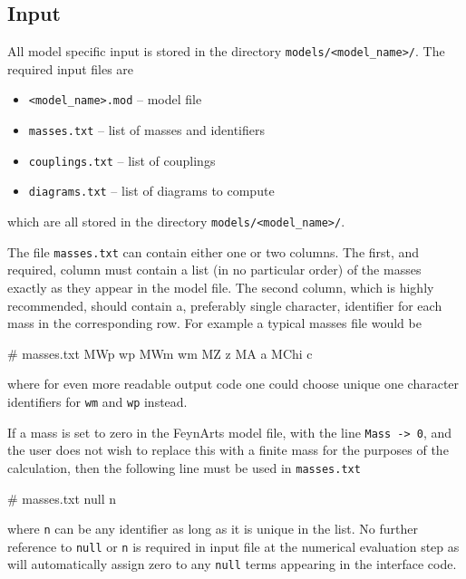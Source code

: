\subsection{Input}

All model specific input is stored in the directory \lstinline{models/<model_name>/}.  The required input files are
\begin{itemize}
\item \lstinline{<model_name>.mod}  -- \feynarts model file
\item \lstinline{masses.txt} -- list of masses and identifiers
\item \lstinline{couplings.txt} -- list of couplings
\item \lstinline{diagrams.txt} -- list of diagrams to compute
\end{itemize}
which are all stored in the directory \lstinline{models/<model_name>/}.

The file \lstinline{masses.txt} can contain either one or two columns.  The first, and required, column must contain a list (in no particular order) of the masses exactly as they appear in the \feynarts model file.  The second column, which is highly recommended, should contain a, preferably single character, identifier for each mass in the corresponding row.  For example a typical masses file would be
\begin{lstterm}
# masses.txt
MWp          wp
MWm          wm
MZ           z
MA           a
MChi	       c
\end{lstterm}
where for even more readable output code one could choose unique one character identifiers for \lstinline{wm} and \lstinline{wp} instead.

If a mass is set to zero in the FeynArts model file, with the line \lstinline{Mass -> 0}, and the user does not wish to replace this with a finite mass for the purposes of the calculation, then the following line must be used in \lstinline{masses.txt}
\begin{lstterm}
# masses.txt
null n
\end{lstterm}
where \lstinline{n} can be any identifier as long as it is unique in the list.  No further reference to \lstinline{null} or \lstinline{n} is required in input file at the numerical evaluation step as \mb will automatically assign zero to any \lstinline{null} terms appearing in the \tsil interface code.


